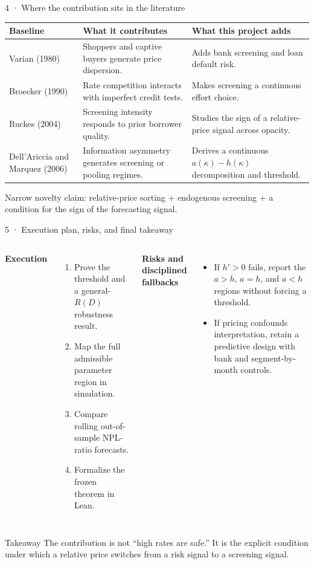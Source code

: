 \documentclass[aspectratio=169,11pt]{beamer}
\begin{document}
\begin{frame}{4 · Where the contribution sits in the literature}
  \scriptsize
  \begin{tabular}{
    >{\raggedright\arraybackslash}p{}
    >{\raggedright\arraybackslash}p{}
    >{\raggedright\arraybackslash}p{}}
    \toprule
    \textbf{Baseline} & \textbf{What it contributes} & \textbf{What this project adds} \\
    \midrule
    Varian (1980) & Shoppers and captive buyers generate price dispersion. & Adds bank screening and loan default risk. \\
    \addlinespace
    Broecker (1990) & Rate competition interacts with imperfect credit tests. & Makes screening a continuous effort choice. \\
    \addlinespace
    Ruckes (2004) & Screening intensity responds to prior borrower quality. & Studies the sign of a relative-price signal across opacity. \\
    \addlinespace
    Dell'Ariccia and Marquez (2006) & Information asymmetry generates screening or pooling regimes. & Derives a continuous \(a(\kappa)-h(\kappa)\) decomposition and threshold. \\
    \bottomrule
  \end{tabular}
  \vfill
  \normalsize
  \centering
  \alert{Narrow novelty claim:} relative-price sorting + endogenous screening +
  a condition for the sign of the forecasting signal.
\end{frame}

\begin{frame}{5 · Execution plan, risks, and final takeaway}
  \small
  \begin{columns}[T,onlytextwidth]
      \textbf{Execution}
      \begin{enumerate}
        \item Prove the threshold and a general-\(R(D)\) robustness result.
        \item Map the full admissible parameter region in simulation.
        \item Compare rolling out-of-sample NPL-ratio forecasts.
        \item Formalize the frozen theorem in Lean.
      \end{enumerate}
      \textbf{Risks and disciplined fallbacks}
      \begin{itemize}
        \item If \(h'>0\) fails, report the \(a>h\), \(a=h\), and \(a<h\)
              regions without forcing a threshold.
        \item If pricing confounds interpretation, retain a predictive design
              with bank and segment-by-month controls.
      \end{itemize}
  \end{columns}
  \vfill
  \begin{alertblock}{Takeaway}
    The contribution is not ``high rates are safe.'' It is the explicit condition
    under which a relative price switches from a risk signal to a screening signal.
  \end{alertblock}
\end{frame}
\end{document}
